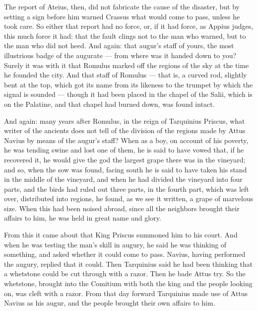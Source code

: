  The report of Ateius, then, did not fabricate the cause of the disaster, but by setting a sign before him warned Crassus what would come to pass, unless he took care. So either that report had no force, or, if it had force, as Appius judges, this much force it had: that the fault clings not to the man who warned, but to the man who did not heed. And again: that augur's staff of yours, the most illustrious badge of the augurate — from where was it handed down to you? Surely it was with it that Romulus marked off the regions of the sky at the time he founded the city. And that staff of Romulus — that is, a curved rod, slightly bent at the top, which got its name from its likeness to the trumpet by which the signal is sounded — though it had been placed in the chapel of the Salii, which is on the Palatine, and that chapel had burned down, was found intact.

 And again: many years after Romulus, in the reign of Tarquinius Priscus, what writer of the ancients does not tell of the division of the regions made by Attus Navius by means of the augur's staff? When as a boy, on account of his poverty, he was tending swine and lost one of them, he is said to have vowed that, if he recovered it, he would give the god the largest grape there was in the vineyard; and so, when the sow was found, facing south he is said to have taken his stand in the middle of the vineyard, and when he had divided the vineyard into four parts, and the birds had ruled out three parts, in the fourth part, which was left over, distributed into regions, he found, as we see it written, a grape of marvelous size. When this had been noised abroad, since all the neighbors brought their affairs to him, he was held in great name and glory.

 From this it came about that King Priscus summoned him to his court. And when he was testing the man's skill in augury, he said he was thinking of something, and asked whether it could come to pass. Navius, having performed the augury, replied that it could. Then Tarquinius said he had been thinking that a whetstone could be cut through with a razor. Then he bade Attus try. So the whetstone, brought into the Comitium with both the king and the people looking on, was cleft with a razor. From that day forward Tarquinius made use of Attus Navius as his augur, and the people brought their own affairs to him.

